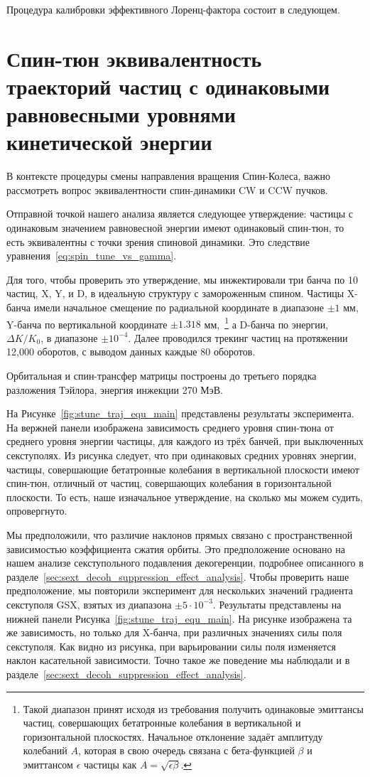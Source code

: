 Процедура калибровки эффективного Лоренц-фактора состоит в следующем.



\section{Спин-тюн эквивалентность траекторий частиц с одинаковыми равновесными уровнями кинетической энергии}\label{sec:spin_tune_traj_equivalence}
В контексте процедуры смены направления вращения Спин-Колеса, важно рассмотреть вопрос эквивалентности спин-динамики CW и CCW пучков. 

Отправной точкой нашего анализа является следующее утверждение: частицы с одинаковым значением равновесной энергии имеют одинаковый спин-тюн, то есть эквивалентны с точки зрения спиновой динамики. Это следствие уравнения~\eqref{eq:spin_tune_vs_gamma}. 

Для того, чтобы проверить это утверждение, мы инжектировали три банча по 10 частиц, X, Y, и D, в идеальную структуру с замороженным спином. Частицы X-банча имели начальное смещение по радиальной координате в диапазоне $\pm 1$ мм, Y-банча по вертикальной координате $\pm 1.318$ мм,~\footnote{Такой диапазон принят исходя из требования получить одинаковые эмиттансы частиц, совершающих бетатронные колебания в вертикальной и горизонтальной плоскостях. Начальное отклонение задаёт амплитуду колебаний $A$, которая в свою очередь связана с бета-функцией  $\beta$ и эмиттансом $\epsilon$ частицы как $A = \sqrt{\epsilon \beta}$. } а D-банча по энергии,  $\Delta K/K_0$, в диапазоне $\pm 10^{-4}$. Далее проводился трекинг частиц на протяжении 12,000 оборотов, с выводом данных каждые 80 оборотов.

Орбитальная и спин-трансфер матрицы построены до третьего порядка разложения Тэйлора, энергия инжекции 270 МэВ.

На Рисунке~\ref{fig:stune_traj_equ_main} представлены результаты эксперимента. На вержней панели изображена зависимость среднего уровня спин-тюна от среднего уровня энергии частицы, для каждого из трёх банчей, при выключенных секступолях. Из рисунка следует, что при одинаковых средних уровнях энергии, частицы, совершающие бетатронные колебания в вертикальной плоскости имеют спин-тюн, отличный от частиц, совершающих колебания в горизонтальной плоскости. То есть, наше изначальное утверждение, на сколько мы можем судить, опровергнуто.

Мы предположили, что различие наклонов прямых связано с пространственной зависимостью коэффициента сжатия орбиты. Это предположение основано на нашем анализе секступольного подавления декогеренции, подробнее описанного в разделе~\ref{sec:sext_decoh_suppression_effect_analysis}. Чтобы проверить наше предположение, мы повторили эксперимент для нескольких значений градиента секступоля GSX, взятых из диапазона $\pm 5\cdot 10^{-3}$.  Результаты представлены на  нижней панели Рисунка~\ref{fig:stune_traj_equ_main}. На рисунке изображена та же зависимость, но только для X-банча, при различных значениях силы поля секступоля. Как видно из рисунка, при варьировании силы поля изменяется наклон касательной зависимости. Точно такое же поведение мы наблюдали и в разделе~\ref{sec:sext_decoh_suppression_effect_analysis}.

